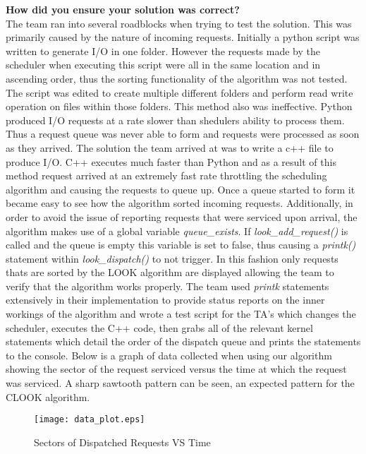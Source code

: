 \documentclass[10pt,onecolumn,draftclsnofoot]{IEEEtran} %
\begin{document}
\begin{singlespace}
        \textbf{How did you ensure your solution was correct?}\\

                \normalfont \indent The team ran into several roadblocks when trying to test the solution. This was primarily caused by the nature of incoming requests. Initially a python script was written to generate I/O in one folder. However the requests made by the scheduler when executing this script were all in the same location and in ascending order, thus the sorting functionality of the algorithm was not tested. The script was edited to create multiple different folders and perform read write operation on files within those folders. This method also was ineffective. Python produced I/O requests at a rate slower than shedulers ability to process them. Thus a request queue was never able to form and requests were processed as soon as they arrived. The solution the team arrived at was to write a c++ file to produce I/O. C++ executes much faster than Python and as a result of this method request arrived at an extremely fast rate throttling the scheduling algorithm and causing the requests to queue up. Once a queue started to form it became easy to see how the algorithm sorted incoming requests. Additionally, in order to avoid the issue of reporting requests that were serviced upon arrival, the algorithm makes use of a global variable \textit{queue\_exists}. If \textit{look\_add\_request()} is called and the queue is empty this variable is set to false, thus causing a \textit{printk()} statement within \textit{look\_dispatch()} to not trigger. In this fashion only requests thats are sorted by the LOOK algorithm are displayed allowing the team to verify that the algorithm works properly. The team used \textit{printk} statements extensively in their implementation to provide status reports on the inner workings of the algorithm and wrote a test script for the TA's which changes the scheduler, executes the C++ code, then grabs all of the relevant kernel statements which detail the order of the dispatch queue and prints the statements to the console. Below is a graph of data collected when using our algorithm showing the sector of the request serviced versus the time at which the request was serviced. A sharp sawtooth pattern can be seen, an expected pattern for the CLOOK algorithm.\\

	\begin{center}	
        \begin{figure}[H]
                \texttt{[image: data\_plot.eps]}
                \caption{Sectors of Dispatched Requests VS Time}
                \label{fig: Class Diagram 1}
        \end{figure}
	\end{center}


\end{singlespace}
\end{document}
